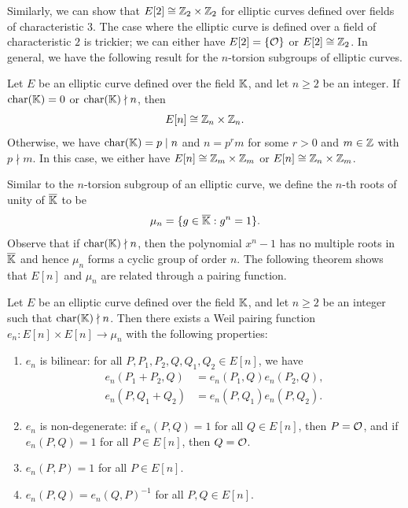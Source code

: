 Similarly, we can show that $E[2] \cong \mathbb{Z}_2 \times \mathbb{Z}_2$ for elliptic curves 
defined over fields of characteristic $3$. The case where the elliptic curve 
is defined over a field of characteristic $2$ is trickier; we can either have 
$E[2] = \{{\cal O}\}$ or $E[2] \cong \mathbb{Z}_2$. In general, we have the following 
result for the $n$-torsion subgroups of elliptic curves. 

\begin{thm}
    Let $E$ be an elliptic curve defined over the field $\mathbb{K}$, and let 
    $n \geq 2$ be an integer. If $\operatorname{char}(\mathbb{K}) = 0$ or $\operatorname{char}(\mathbb{K}) \nmid n$, then 
    \[ E[n] \cong \mathbb{Z}_n \times \mathbb{Z}_n. \] 
    Otherwise, we have $\operatorname{char}(\mathbb{K}) = p \mid n$ and $n = p^rm$ for some $r > 0$ 
    and $m \in \mathbb{Z}$ with $p \nmid m$. In this case, we either have
    $E[n] \cong \mathbb{Z}_m \times \mathbb{Z}_m$ or $E[n] \cong \mathbb{Z}_n \times \mathbb{Z}_m$. 
\end{thm}

Similar to the $n$-torsion subgroup of an elliptic curve, we define the 
$n$-th roots of unity of $\overline{\mathbb{K}}$ to be 
\[ \mu_n = \{g \in \overline{\mathbb{K}} : g^n = 1\}. \] 
Observe that if $\operatorname{char}(\mathbb{K}) \nmid n$, then the polynomial $x^n - 1$ has no multiple 
roots in $\overline{\mathbb{K}}$ and hence $\mu_n$ forms a cyclic group of order $n$. 
The following theorem shows that $E[n]$ and $\mu_n$ are related through a 
pairing function. 

\begin{thm}
    Let $E$ be an elliptic curve defined over the field $\mathbb{K}$, and let 
    $n \geq 2$ be an integer such that $\operatorname{char}(\mathbb{K}) \nmid n$. Then there exists a 
    Weil pairing function $e_n : E[n] \times E[n] \to \mu_n$ with the following 
    properties:
    \begin{enumerate}[(1)]
        \item $e_n$ is bilinear: for all $P, P_1, P_2, Q, Q_1, Q_2 \in E[n]$, we have 
        \begin{align*}
            e_n(P_1 + P_2, Q) &= e_n(P_1, Q) e_n(P_2, Q), \\ 
            e_n(P, Q_1 + Q_2) &= e_n(P, Q_1) e_n(P, Q_2). 
        \end{align*}
        \item $e_n$ is non-degenerate: if $e_n(P, Q) = 1$ for all $Q \in E[n]$, 
        then $P = {\cal O}$, and if $e_n(P, Q) = 1$ for all $P \in E[n]$, then 
        $Q = {\cal O}$. 
        \item $e_n(P, P) = 1$ for all $P \in E[n]$. 
        \item $e_n(P, Q) = e_n(Q, P)^{-1}$ for all $P, Q \in E[n]$. 
    \end{enumerate}
\end{thm}

